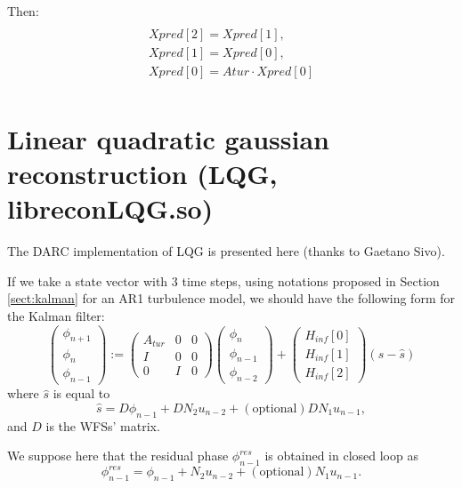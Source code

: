 \documentclass[a4,10pt]{article}
\begin{document}
Then: 
\begin{multline}\\
Xpred[2]=Xpred[1],\\
Xpred[1]=Xpred[0],\\
Xpred[0]=Atur \cdot Xpred[0]\\
\end{multline}



\section{Linear quadratic gaussian reconstruction (LQG, libreconLQG.so)}
\label{sect:lqg}
The DARC  implementation of LQG is presented here (thanks to Gaetano Sivo).

If we take a state vector with 3 time steps, using
notations proposed in Section \ref{sect:kalman} for an AR1 turbulence model, we should have the following form for the Kalman filter:
\begin{equation}
\begin{pmatrix}
\phi_{n+1} \\
\phi_n \\
\phi_{n-1} \end{pmatrix}
:=\begin{pmatrix}A_{tur} &0&0\\
I&0&0\\
0&I&0\end{pmatrix}\begin{pmatrix}
\phi_{n}\\
\phi_{n-1}\\
\phi_{n-2}\end{pmatrix}+\begin{pmatrix}H_{inf}[0]\\H_{inf}[1]\\H_{inf}[2]\end{pmatrix}(s-\hat{s})
\label{eq:Kalman1}
\end{equation}
where $\hat{s}$ is equal to
\begin{equation}
\hat{s}=D\phi_{n-1}+DN_2u_{n-2} + \mathrm{(optional)} DN_1u_{n-1},
\label{eq:shat}
\end{equation}
and $D$ is the WFSs' matrix.

We suppose here that the residual phase $\phi^{res}_{n-1}$ is obtained in closed loop as
\begin{equation}
\phi^{res}_{n-1}=\phi_{n-1}+N_2u_{n-2} + \mathrm{(optional)} N_1u_{n-1}.
\end{equation}
\end{document}

